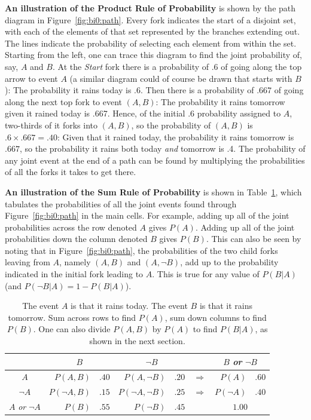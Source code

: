 \textbf{An illustration of the Product Rule of Probability} is shown by the path diagram in Figure~\ref{fig:bi0:path}. Every fork indicates the start of a disjoint set, with each of the elements of that set represented by the branches extending out. The lines indicate the probability of selecting each element from within the set. Starting from the left, one can trace this diagram to find the joint probability of, say, $A$ and $B$. At the \emph{Start} fork there is a probability of .6 of going along the top arrow to event $A$ (a similar diagram could of course be drawn that starts with $B$): The probability it rains today is .6. Then there is a probability of .667 of going along the next top fork to event $(A,B)$: The probability it rains tomorrow given it rained today is .667. Hence, of the initial .6 probability assigned to $A$, two-thirds of it forks into $(A,B)$, so the probability of $(A,B)$ is $.6 \times .667 = .40$: Given that it rained today, the probability it rains tomorrow is $.667$, so the probability it rains both today \textit{and} tomorrow is .4. The probability of any joint event at the end of a path can be found by multiplying the probabilities of all the forks it takes to get there.

\textbf{An illustration of the Sum Rule of Probability} is shown in Table~\ref{tab:bi0:prob}, which tabulates the probabilities of all the joint events found through Figure~\ref{fig:bi0:path} in the main cells. For example, adding up all of the joint probabilities across the row denoted $A$ gives $P(A)$. Adding up all of the joint probabilities down the column denoted $B$ gives $P(B)$. This can also be seen by noting that in Figure~\ref{fig:bi0:path}, the probabilities of the two child forks leaving from $A$, namely $(A,B)$ and $(A,\neg B)$, add up to the probability indicated in the initial fork leading to $A$. This is true for any value of $P(B|A)$ (and $P(\neg B|A) = 1 - P(B|A)$).



\begin{table}\caption{The event $A$ is that it rains today. The event $B$ is that it rains tomorrow. Sum across rows to find $P(A)$, sum down columns to find $P(B)$. One can also divide $P(A,B)$ by $P(A)$ to find $P(B|A)$, as shown in the next section.}
\label{tab:bi0:prob}\centering
\begin{tabular}{cr@{ = }lr@{ = }lcr@{ = }l}
 & \multicolumn{2}{c}{$B$} & \multicolumn{2}{c}{$\neg{B}$} & &\multicolumn{2}{c}{$B$ \textit{or} $\neg{B}$}
 \\[0.5ex]
\hline
$A$ & $P(A,B)$ & $.40$ & $P(A,\neg{B})$ & $.20$ & $\Rightarrow$ & $P(A)$ & $.60$\\
$\neg{A}$ & $P(\neg{A},B)$ & $.15$ & $P(\neg{A},\neg{B})$ & $.25$ & $\Rightarrow$ & $P(\neg A)$ & $.40$ \\[0.5ex] 
$A$ \textit{or} $\neg A$ & $P(B)$ & $.55$ & $P(\neg B)$ & $.45$ && \multicolumn{2}{c}{$1.00$} \\[0.5ex]\hline
\end{tabular}
\end{table}
 
